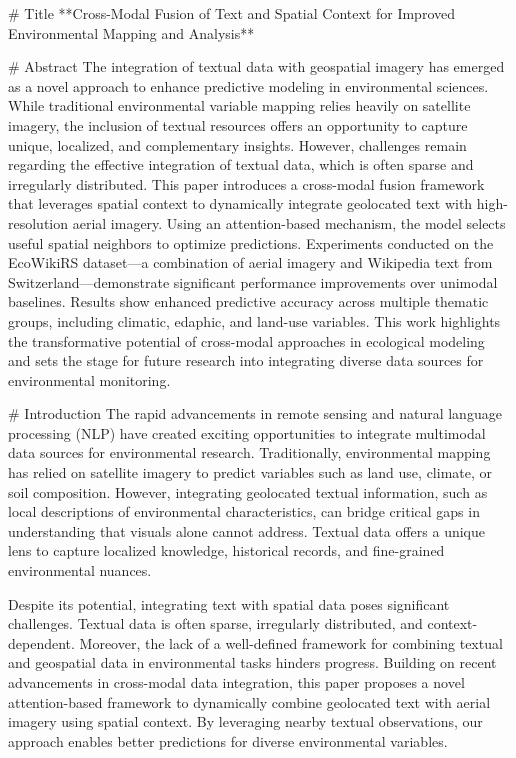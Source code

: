 # Title  
**Cross-Modal Fusion of Text and Spatial Context for Improved Environmental Mapping and Analysis**

# Abstract  
The integration of textual data with geospatial imagery has emerged as a novel approach to enhance predictive modeling in environmental sciences. While traditional environmental variable mapping relies heavily on satellite imagery, the inclusion of textual resources offers an opportunity to capture unique, localized, and complementary insights. However, challenges remain regarding the effective integration of textual data, which is often sparse and irregularly distributed. This paper introduces a cross-modal fusion framework that leverages spatial context to dynamically integrate geolocated text with high-resolution aerial imagery. Using an attention-based mechanism, the model selects useful spatial neighbors to optimize predictions. Experiments conducted on the EcoWikiRS dataset—a combination of aerial imagery and Wikipedia text from Switzerland—demonstrate significant performance improvements over unimodal baselines. Results show enhanced predictive accuracy across multiple thematic groups, including climatic, edaphic, and land-use variables. This work highlights the transformative potential of cross-modal approaches in ecological modeling and sets the stage for future research into integrating diverse data sources for environmental monitoring.

# Introduction  
The rapid advancements in remote sensing and natural language processing (NLP) have created exciting opportunities to integrate multimodal data sources for environmental research. Traditionally, environmental mapping has relied on satellite imagery to predict variables such as land use, climate, or soil composition. However, integrating geolocated textual information, such as local descriptions of environmental characteristics, can bridge critical gaps in understanding that visuals alone cannot address. Textual data offers a unique lens to capture localized knowledge, historical records, and fine-grained environmental nuances.

Despite its potential, integrating text with spatial data poses significant challenges. Textual data is often sparse, irregularly distributed, and context-dependent. Moreover, the lack of a well-defined framework for combining textual and geospatial data in environmental tasks hinders progress. Building on recent advancements in cross-modal data integration, this paper proposes a novel attention-based framework to dynamically combine geolocated text with aerial imagery using spatial context. By leveraging nearby textual observations, our approach enables better predictions for diverse environmental variables.

